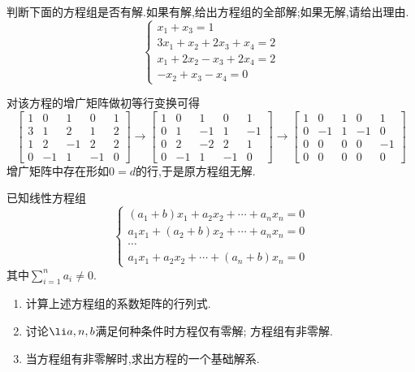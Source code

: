 \documentclass{ctexart}
\begin{document}
\pagestyle{empty}
\begin{center}
\end{center}
\begin{homework}[1(10')]
    判断下面的方程组是否有解.如果有解,给出方程组的全部解;如果无解,请给出理由.
    \[\left\{\begin{array}{l}
        x_1+x_3=1\\
        3x_1+x_2+2x_3+x_4=2\\
        x_1+2x_2-x_3+2x_4=2\\
        -x_2+x_3-x_4=0
    \end{array}\right.\]
\end{homework}
\begin{solution}
    对该方程的增广矩阵做初等行变换可得
    \[\begin{bmatrix}
        1&0&1&0&1\\
        3&1&2&1&2\\
        1&2&-1&2&2\\
        0&-1&1&-1&0
    \end{bmatrix}\longrightarrow\begin{bmatrix}
        1&0&1&0&1\\
        0&1&-1&1&-1\\
        0&2&-2&2&1\\
        0&-1&1&-1&0
    \end{bmatrix}\longrightarrow\begin{bmatrix}
        1&0&1&0&1\\
        0&-1&1&-1&0\\
        0&0&0&0&-1\\
        0&0&0&0&0
    \end{bmatrix}\]
    增广矩阵中存在形如$0=d$的行,于是原方程组无解.
\end{solution}
\begin{homework}[2(10')]
    已知线性方程组
    \[\left\{\begin{array}{c}
        \left(a_1+b\right)x_1+a_2x_2+\cdots+a_nx_n=0\\
        a_1x_1+\left(a_2+b\right)x_2+\cdots+a_nx_n=0\\
        \cdots\\
        a_1x_1+a_2x_2+\cdots+\left(a_n+b\right)x_n=0
    \end{array}\right.\]
    其中$\displaystyle\sum_{i=1}^{n}a_i\neq0$.
    \begin{enumerate}[label=\tbf{(\arabic*)},topsep=0pt,parsep=0pt,itemsep=0pt,partopsep=0pt]
        \item 计算上述方程组的系数矩阵的行列式.
        \item 讨论$\li a,n,b$满足何种条件时方程仅有零解; 方程组有非零解.
        \item 当方程组有非零解时,求出方程的一个基础解系.
    \end{enumerate}
\end{homework}
\end{document}

